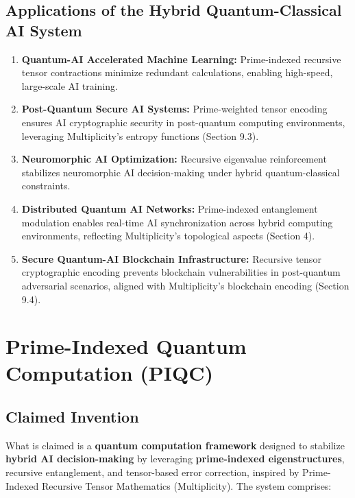 \documentclass[12pt]{article}
\begin{document}
\subsection{Applications of the Hybrid Quantum-Classical AI System}

\begin{enumerate}
    \item \textbf{Quantum-AI Accelerated Machine Learning:} Prime-indexed recursive tensor contractions minimize redundant calculations, enabling high-speed, large-scale AI training.
    \item \textbf{Post-Quantum Secure AI Systems:} Prime-weighted tensor encoding ensures AI cryptographic security in post-quantum computing environments, leveraging Multiplicity’s entropy functions (Section 9.3).
    \item \textbf{Neuromorphic AI Optimization:} Recursive eigenvalue reinforcement stabilizes neuromorphic AI decision-making under hybrid quantum-classical constraints.
    \item \textbf{Distributed Quantum AI Networks:} Prime-indexed entanglement modulation enables real-time AI synchronization across hybrid computing environments, reflecting Multiplicity’s topological aspects (Section 4).
    \item \textbf{Secure Quantum-AI Blockchain Infrastructure:} Recursive tensor cryptographic encoding prevents blockchain vulnerabilities in post-quantum adversarial scenarios, aligned with Multiplicity’s blockchain encoding (Section 9.4).
\end{enumerate}


\section{Prime-Indexed Quantum Computation (PIQC)}

\subsection{Claimed Invention}

What is claimed is a \textbf{quantum computation framework} designed to stabilize \textbf{hybrid AI decision-making} by leveraging \textbf{prime-indexed eigenstructures}, recursive entanglement, and tensor-based error correction, inspired by Prime-Indexed Recursive Tensor Mathematics (Multiplicity). The system comprises:
\end{document}
